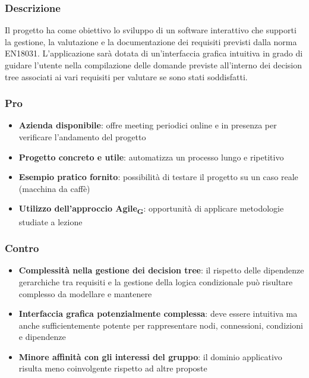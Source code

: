 \documentclass[11pt,a4paper]{article}
\newcommand{\gls}[1]{#1\textsubscript{G}}
\begin{document}
\subsubsection{Descrizione}
Il progetto ha come obiettivo lo sviluppo di un software interattivo che supporti la gestione, la valutazione e la documentazione dei requisiti previsti dalla norma EN18031. L'applicazione sarà dotata di un'interfaccia grafica intuitiva in grado di guidare l'utente nella compilazione delle domande previste all'interno dei decision tree associati ai vari requisiti per valutare se sono stati soddisfatti.

\subsubsection{Pro}
\begin{itemize}
    \item \textbf{Azienda disponibile}: offre meeting periodici online e in presenza per verificare l'andamento del progetto
    \item \textbf{Progetto concreto e utile}: automatizza un processo lungo e ripetitivo
    \item \textbf{Esempio pratico fornito}: possibilità di testare il progetto su un caso reale (macchina da caffè)
    \item \textbf{Utilizzo dell'approccio \gls{Agile}}: opportunità di applicare metodologie studiate a lezione
\end{itemize}

\subsubsection{Contro}
\begin{itemize}
    \item \textbf{Complessità nella gestione dei decision tree}: il rispetto delle dipendenze gerarchiche tra requisiti e la gestione della logica condizionale può risultare complesso da modellare e mantenere
    \item \textbf{Interfaccia grafica potenzialmente complessa}: deve essere intuitiva ma anche sufficientemente potente per rappresentare nodi, connessioni, condizioni e dipendenze
    \item \textbf{Minore affinità con gli interessi del gruppo}: il dominio applicativo risulta meno coinvolgente rispetto ad altre proposte
\end{itemize}

\vspace{0.5cm}
\end{document}
